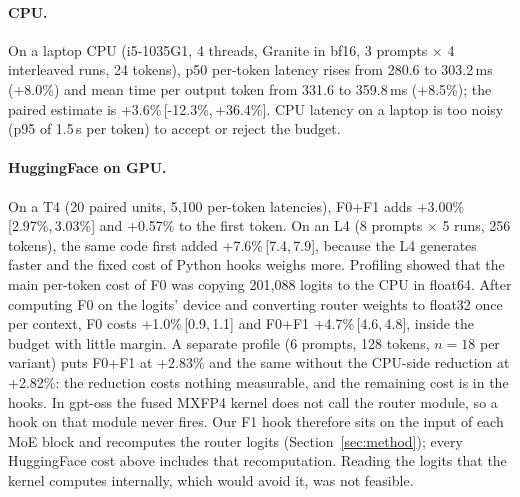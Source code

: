 \documentclass[11pt]{article}
\newcommand{\FZ}{\textsf{F0}}
\newcommand{\FO}{\textsf{F1}}
\newcommand{\FZO}{\textsf{F0+F1}}
\newcommand{\ci}[2]{\,[#1,\,#2]}
\begin{document}
\paragraph{CPU.}
On a laptop CPU (i5-1035G1, 4 threads, Granite in bf16, 3 prompts $\times$ 4 interleaved runs, 24 tokens), p50 per-token latency rises from 280.6 to 303.2\,ms (+8.0\%) and mean time per output token from 331.6 to 359.8\,ms (+8.5\%); the paired estimate is +3.6\%\ci{-12.3\%}{+36.4\%}.
CPU latency on a laptop is too noisy (p95 of 1.5\,s per token) to accept or reject the budget.

\paragraph{HuggingFace on GPU.}
On a T4 (20 paired units, 5,100 per-token latencies), \FZO{} adds +3.00\%\ci{2.97\%}{3.03\%} and +0.57\% to the first token.
On an L4 (8 prompts $\times$ 5 runs, 256 tokens), the same code first added +7.6\%\ci{7.4}{7.9}, because the L4 generates faster and the fixed cost of Python hooks weighs more.
Profiling showed that the main per-token cost of \FZ{} was copying 201,088 logits to the CPU in float64.
After computing \FZ{} on the logits' device and converting router weights to float32 once per context, \FZ{} costs +1.0\%\ci{0.9}{1.1} and \FZO{} +4.7\%\ci{4.6}{4.8}, inside the budget with little margin.
A separate profile (6 prompts, 128 tokens, $n=18$ per variant) puts \FZO{} at +2.83\% and the same without the CPU-side reduction at +2.82\%: the reduction costs nothing measurable, and the remaining cost is in the hooks.
In gpt-oss the fused MXFP4 kernel does not call the router module, so a hook on that module never fires.
Our \FO{} hook therefore sits on the input of each MoE block and recomputes the router logits (Section~\ref{sec:method}); every HuggingFace cost above includes that recomputation.
Reading the logits that the kernel computes internally, which would avoid it, was not feasible.
\end{document}
